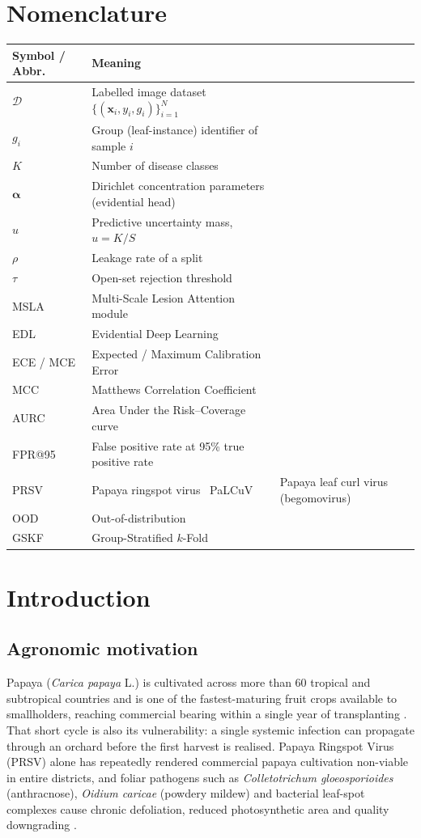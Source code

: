 \documentclass[10pt,twocolumn,a4paper]{article}
\newcommand{\x}{\mathbf{x}}
\newcommand{\balpha}{\boldsymbol{\alpha}}
\begin{document}
\section*{Nomenclature}
\vspace{-3pt}
{\footnotesize
\begin{tabularx}{\columnwidth}{@{}lX@{}}
\toprule
Symbol / Abbr. & Meaning \\
\midrule
$\mathcal{D}$ & Labelled image dataset $\{(\x_i,y_i,g_i)\}_{i=1}^N$ \\
$g_i$ & Group (leaf-instance) identifier of sample $i$ \\
$K$ & Number of disease classes \\
$\balpha$ & Dirichlet concentration parameters (evidential head) \\
$u$ & Predictive uncertainty mass, $u=K/S$ \\
$\rho$ & Leakage rate of a split \\
$\tau$ & Open-set rejection threshold \\
MSLA & Multi-Scale Lesion Attention module \\
EDL & Evidential Deep Learning \\
ECE / MCE & Expected / Maximum Calibration Error \\
MCC & Matthews Correlation Coefficient \\
AURC & Area Under the Risk--Coverage curve \\
FPR@95 & False positive rate at 95\% true positive rate \\
PRSV & Papaya ringspot virus \
 PaLCuV & Papaya leaf curl virus (begomovirus) \\
OOD & Out-of-distribution \\
GSKF & Group-Stratified $k$-Fold \\
\bottomrule
\end{tabularx}}

\section{Introduction}
\label{sec:intro}

\subsection{Agronomic motivation}
Papaya (\textit{Carica papaya} L.) is cultivated across more than 60 tropical and subtropical countries and is one of the fastest-maturing fruit crops available to smallholders, reaching commercial bearing within a single year of transplanting \cite{faostat}. That short cycle is also its vulnerability: a single systemic infection can propagate through an orchard before the first harvest is realised. Papaya Ringspot Virus (PRSV) alone has repeatedly rendered commercial papaya cultivation non-viable in entire districts, and foliar pathogens such as \textit{Colletotrichum gloeosporioides} (anthracnose), \textit{Oidium caricae} (powdery mildew) and bacterial leaf-spot complexes cause chronic defoliation, reduced photosynthetic area and quality downgrading \cite{prsv_review,prsv_agri}.
\end{document}
